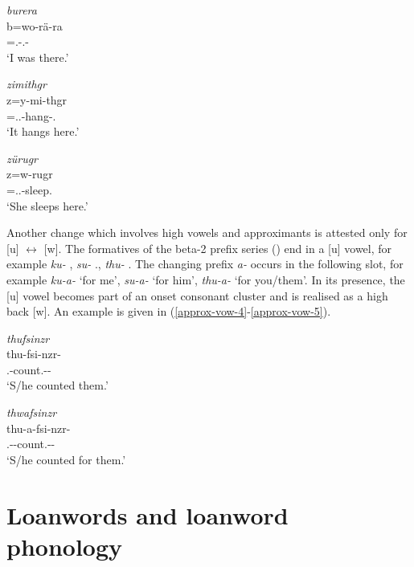 \begin{exe}
	\ex \emph{burera}\\
	\gll b=wo-rä-ra\\
	\Med{}=\Fsg.\Alph-\Cop.{\Ndu}-\Pst{}\\
	\trans `I was there.'
	\label{approx-vow-2}

	\ex \emph{zimithgr}\\
	\gll z=y-mi-thgr\\
	{\Prox}=\Tsg.\Masc.\Alph-hang-\Stat.{\Ndu}\\
	\trans `It hangs here.'
	\label{approx-vow-3}

	\ex \emph{zürugr}\\
	\gll z=w-rugr\\
	{\Prox}=\Tsg.\F.\Alph-sleep.{\Ndu}\\
	\trans `She sleeps here.'
	\label{approx-vow-1}
\end{exe}

Another change which involves high vowels and approximants is attested only for [u] $\leftrightarrow$ [w]. The formatives of the beta-2 prefix series (\Betatwo) end in a [u] vowel, for example \emph{ku-} \Fsg{}, \emph{su-} \Tsg.\Masc{}, \emph{thu-} \Stnsg{}. The  changing prefix \emph{a-} occurs in the following slot, for example \emph{ku-a-} `for me', \emph{su-a-} `for him', \emph{thu-a-} `for you/them'. In its presence, the [u] vowel becomes part of an onset consonant cluster and is realised as a high back  [w]. An example is given in (\ref{approx-vow-4}-\ref{approx-vow-5}).

\begin{exe}
	\ex \emph{thufsinzr}\\
	\gll thu-fsi-nzr-\Zero{}\\
	\Stnsg{}.\Betatwo{}-count.{\Ext}-{\Ndu}-\Stsg{}\\
	\trans `S/he counted them.'
	\label{approx-vow-4}

	\ex \emph{thwafsinzr}\\
	\gll thu-a-fsi-nzr-\Zero{}\\
	\Stnsg{}.\Betatwo{}-{\Vc}-count.{\Ext}-{\Ndu}-\Stsg{}\\
	\trans `S/he counted for them.'
	\label{approx-vow-5}
\end{exe}

\section{Loanwords and loanword phonology} \label{loanword-phonology}

